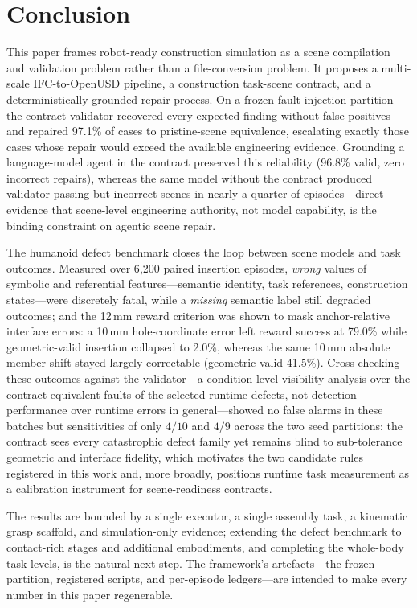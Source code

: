 \section{Conclusion}
\label{sec:conclusion}

This paper frames robot-ready construction simulation as a scene compilation
and validation problem rather than a file-conversion problem. It proposes a
multi-scale IFC-to-OpenUSD pipeline, a construction task-scene contract, and a
deterministically grounded repair process. On a frozen fault-injection
partition the contract validator recovered every expected finding without
false positives and repaired 97.1\% of cases to pristine-scene equivalence,
escalating exactly those cases whose repair would exceed the available
engineering evidence. Grounding a language-model agent in the contract
preserved this reliability (96.8\% valid, zero incorrect repairs), whereas the
same model without the contract produced validator-passing but incorrect
scenes in nearly a quarter of episodes---direct evidence that scene-level
engineering authority, not model capability, is the binding constraint on
agentic scene repair.

The humanoid defect benchmark closes the loop between scene models and task
outcomes. Measured over 6{,}200 paired insertion episodes, \emph{wrong}
values of symbolic and referential features---semantic identity, task
references, construction states---were discretely fatal, while a
\emph{missing} semantic label still degraded outcomes; and the 12\,mm reward
criterion was shown to
mask anchor-relative interface errors: a 10\,mm hole-coordinate error left
reward success at 79.0\% while geometric-valid insertion collapsed to 2.0\%,
whereas the same 10\,mm absolute member shift stayed largely correctable
(geometric-valid 41.5\%). Cross-checking these outcomes against the
validator---a condition-level visibility analysis over the
contract-equivalent faults of the selected runtime defects, not detection
performance over runtime errors in general---showed no false alarms in
these batches but sensitivities of only $4/10$ and
$4/9$ across the two seed partitions: the contract sees every catastrophic
defect family yet remains blind to sub-tolerance geometric and interface
fidelity, which motivates the two candidate rules registered in this work
and, more broadly, positions runtime task measurement as a calibration
instrument for scene-readiness contracts.

The results are bounded by a single executor, a single assembly task, a
kinematic grasp scaffold, and simulation-only evidence; extending the defect
benchmark to contact-rich stages and additional embodiments, and completing
the whole-body task levels, is the natural next step. The framework's
artefacts---the frozen partition, registered scripts, and per-episode
ledgers---are intended to make every number in this paper regenerable.
